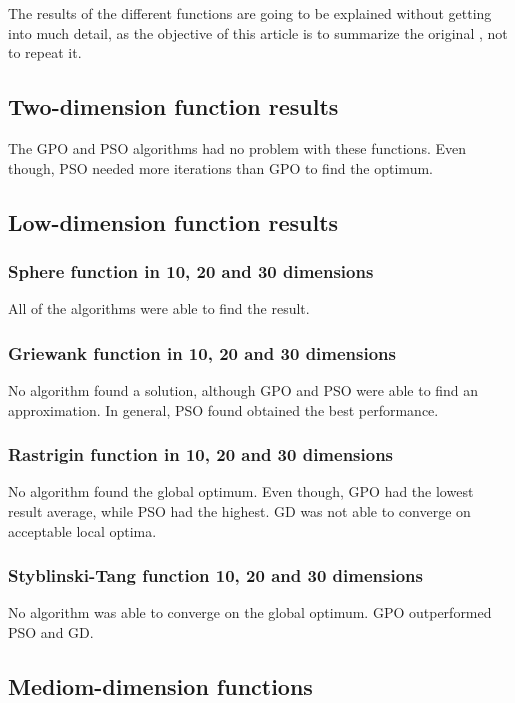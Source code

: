 \documentclass[10pt]{article}
\begin{document}
The results of the different functions are going to be explained without getting
into much detail, as the objective of this article is to summarize the original
\cite{artgpo}, not to repeat it.

\subsection{Two-dimension function results}

The GPO and PSO algorithms had no problem with these functions. Even though, PSO
needed more iterations than GPO to find the optimum.

\subsection{Low-dimension function results}

\subsubsection{Sphere function in 10, 20 and 30 dimensions}

All of the algorithms were able to find the result.

\subsubsection{Griewank function in 10, 20 and 30 dimensions}

No algorithm found a solution, although GPO and PSO were able to find an
approximation. In general, PSO found obtained the best performance.

\subsubsection{Rastrigin function in 10, 20 and 30 dimensions}

No algorithm found the global optimum. Even though, GPO had the lowest result
average, while PSO had the highest. GD was not able to converge on acceptable
local optima.

\subsubsection{Styblinski-Tang function 10, 20 and 30 dimensions}

No algorithm was able to converge on the global optimum. GPO outperformed PSO
and GD.

\subsection{Mediom-dimension functions}
\end{document}
